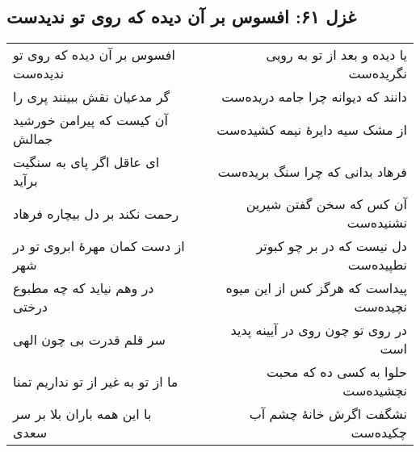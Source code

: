 \begin{center}
\section*{غزل ۶۱: افسوس بر آن دیده که روی تو ندیدست}
\label{sec:061}
\begin{longtable}{l p{0.5cm} r}
افسوس بر آن دیده که روی تو ندیده‌ست
&&
یا دیده و بعد از تو به رویی نگریده‌ست
\\
گر مدعیان نقش ببینند پری را
&&
دانند که دیوانه چرا جامه دریده‌ست
\\
آن کیست که پیرامن خورشید جمالش
&&
از مشک سیه دایرهٔ نیمه کشیده‌ست
\\
ای عاقل اگر پای به سنگیت برآید
&&
فرهاد بدانی که چرا سنگ بریده‌ست
\\
رحمت نکند بر دل بیچاره فرهاد
&&
آن کس که سخن گفتن شیرین نشنیده‌ست
\\
از دست کمان مهرهٔ ابروی تو در شهر
&&
دل نیست که در بر چو کبوتر نطپیده‌ست
\\
در وهم نیاید که چه مطبوع درختی
&&
پیداست که هرگز کس از این میوه نچیده‌ست
\\
سر قلم قدرت بی چون الهی
&&
در روی تو چون روی در آیینه پدید است
\\
ما از تو به غیر از تو نداریم تمنا
&&
حلوا به کسی ده که محبت نچشیده‌ست
\\
با این همه باران بلا بر سر سعدی
&&
نشگفت اگرش خانهٔ چشم آب چکیده‌ست
\\
\end{longtable}
\end{center}
